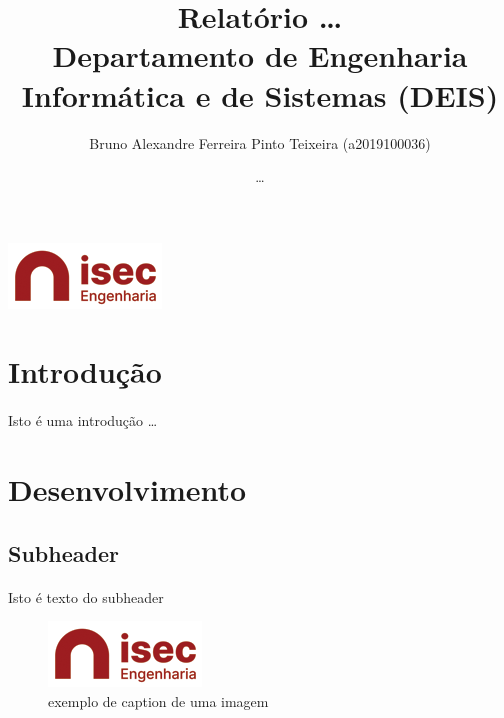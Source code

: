 \documentclass[letterpaper, 11pt]{article}
\author{Bruno Alexandre Ferreira Pinto Teixeira (a2019100036)}
\date{\ldots{}}
\title{Relatório \ldots{}\\\medskip
\large Departamento de Engenharia Informática e de Sistemas (DEIS)}
\begin{document}
\maketitle
\begin{center}
\includegraphics[width=5 cm]{images/isec.png}
\end{center}

\clearpage
\tableofcontents
\clearpage
\listoffigures
\clearpage

\section{Introdução}
\label{sec:org17d4c60}

\paragraph{}
Isto é uma introdução \ldots{}
\clearpage

\section{Desenvolvimento}
\label{sec:orgdf06671}
\subsection{Subheader}
\label{sec:org89d6058}

\paragraph{}
Isto é texto do subheader

\begin{figure}[htbp]
\centering
\includegraphics[width=.9\linewidth]{images/isec.png}
\caption{\label{fig:orgbc82246}
exemplo de caption de uma imagem}
\end{figure}
\end{document}
